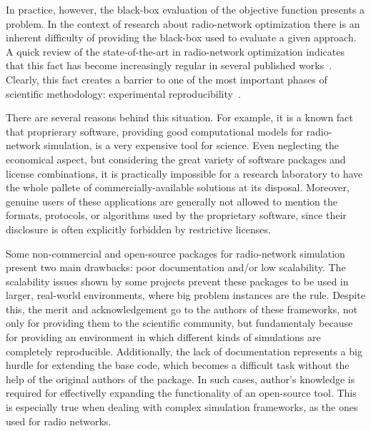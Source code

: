 \bigskip{}


In practice, however, the black-box evaluation of the objective function
presents a problem. In the context of research about radio-network
optimization there is an inherent difficulty of providing the black-box
used to evaluate a given approach. A quick review of the state-of-the-art
in radio-network optimization indicates that this fact has become
increasingly regular in several published works~\cite{amaldi2007radio_planning,chen2008automated,chen2009fast,gordejuela2009two,siomina2008enhancing,siomina2007minimum_pilot_power}.
Clearly, this fact creates a barrier to one of the most important
phases of scientific methodology: experimental reproducibility~\cite{gauch2002scientific}. 

There are several reasons behind this situation. For example, it is
a known fact that proprierary software, providing good computational
models for radio-network simulation, is a very expensive tool for
science. Even neglecting the economical aspect, but considering the
great variety of software packages and license combinations, it is
practically impossible for a research laboratory to have the whole
pallete of commercially-available solutions at its disposal. Moreover,
genuine users of these applications are generally not allowed to mention
the formats, protocols, or algorithms used by the proprietary software,
since their disclosure is often explicitly forbidden by restrictive
licenses.

Some non-commercial and open-source packages for radio-network simulation~\cite{Ozimek_Open.source.radio.coverage.prediction:2010,Momentum.project,Mehlfuhrer_The_Vienna_LTE_Simulators_enabling_reproducibility_in_wireless_communications_research:2011,Pillekeit-A_hybrid_simulation_framework_for_the_evaluation_of_common_RRM:2012,Piro_Simulating_LTE_cellular_systems_an_open_source_framework:2011,Yeung-Detailed_OFDM_modeling_in_network_simulation:2004}
present two main drawbacks: poor documentation and/or low scalability.
The scalability issues shown by some projects prevent these packages
to be used in larger, real-world environments, where big problem instances
are the rule. Despite this, the merit and acknowledgement go to the
authors of these frameworks, not only for providing them to the scientific
community, but fundamentaly because for providing an environment in
which different kinds of simulations are completely reproducible.
Additionally, the lack of documentation represents a big hurdle for
extending the base code, which becomes a difficult task without the
help of the original authors of the package. In such cases, author's
knowledge is required for effectivelly expanding the functionality
of an open-source tool. This is especially true when dealing with
complex simulation frameworks, as the ones used for radio networks.


